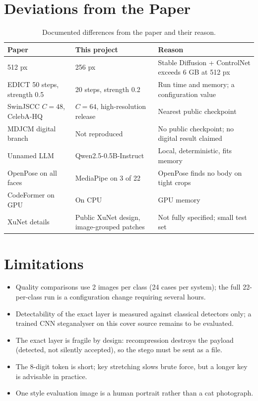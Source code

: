 \section{Deviations from the Paper}\label{sec:deviations}
\begin{table}[H]
	\centering
	\caption{Documented differences from the paper and their reason.}
	\label{tab:dev}
	\begin{tabularx}{\textwidth}{|X|X|X|}
		\hline
		\textbf{Paper} & \textbf{This project} & \textbf{Reason} \\ \hline
		512 px & 256 px & Stable Diffusion + ControlNet exceeds 6 GB at 512 px \\ \hline
		EDICT 50 steps, strength 0.5 & 20 steps, strength 0.2 & Run time and memory; a configuration value \\ \hline
		SwinJSCC $C=48$, CelebA-HQ & $C=64$, high-resolution release & Nearest public checkpoint \\ \hline
		MDJCM digital branch & Not reproduced & No public checkpoint; no digital result claimed \\ \hline
		Unnamed LLM & Qwen2.5-0.5B-Instruct & Local, deterministic, fits memory \\ \hline
		OpenPose on all faces & MediaPipe on 3 of 22 & OpenPose finds no body on tight crops \\ \hline
		CodeFormer on GPU & On CPU & GPU memory \\ \hline
		XuNet details & Public XuNet design, image-grouped patches & Not fully specified; small test set \\ \hline
	\end{tabularx}
\end{table}

\section{Limitations}
\begin{itemize}
	\item Quality comparisons use 2 images per class (24 cases per system); the full 22-per-class
	run is a configuration change requiring several hours.
	\item Detectability of the exact layer is measured against classical detectors only; a trained
	CNN steganalyser on this cover source remains to be evaluated.
	\item The exact layer is fragile by design: recompression destroys the payload (detected, not
	silently accepted), so the stego must be sent as a file.
	\item The 8-digit token is short; key stretching slows brute force, but a longer key is
	advisable in practice.
	\item One style evaluation image is a human portrait rather than a cat photograph.
\end{itemize}
